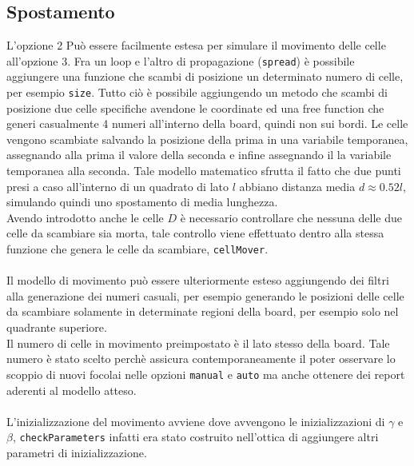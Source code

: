 \documentclass[a4paper]{article}
\begin{document}
\subsection{Spostamento}
L'opzione 2 Può essere facilmente estesa per simulare il movimento delle celle all'opzione 3. Fra un loop e l'altro di propagazione (\texttt{spread}) è possibile aggiungere una funzione che scambi di posizione un determinato numero di celle, per esempio \texttt{size}. Tutto ciò è possibile aggiungendo un metodo che scambi di posizione due celle specifiche avendone le coordinate ed una free function che generi casualmente 4 numeri all'interno della board, quindi non sui bordi. Le celle vengono scambiate salvando la posizione della prima in una variabile temporanea, assegnando alla prima il valore della seconda e infine assegnando il la variabile temporanea alla seconda. Tale modello matematico sfrutta il fatto che due punti presi a caso all'interno di un quadrato di lato $l$ abbiano distanza media $d \approx 0.52l$, simulando quindi uno spostamento di media lunghezza.\\
Avendo introdotto anche le celle $D$ è necessario controllare che nessuna delle due celle da scambiare sia morta, tale controllo viene effettuato dentro alla stessa funzione che genera le celle da scambiare, \texttt{cellMover}.\\ \\
Il modello di movimento può essere ulteriormente esteso aggiungendo dei filtri alla generazione dei numeri casuali, per esempio generando le posizioni delle celle da scambiare solamente in determinate regioni della board, per esempio solo nel quadrante superiore.\\
Il numero di celle in movimento preimpostato è il lato stesso della board. Tale numero è stato scelto perchè assicura contemporaneamente il poter osservare lo scoppio di nuovi focolai nelle opzioni \texttt{manual} e \texttt{auto} ma anche ottenere dei report aderenti al modello atteso. \\ \\
L'inizializzazione del movimento avviene dove avvengono le inizializzazioni di $\gamma$ e $\beta$, \texttt{checkParameters} infatti era stato costruito nell'ottica di aggiungere altri parametri di inizializzazione.\\
\end{document}
